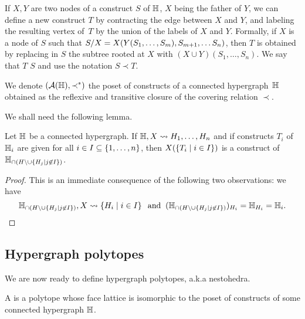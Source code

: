 If $X,Y$ are two nodes of a construct $S$ of ${\mathbb H}$, $X$ being the father of $Y$, we can define a new construct $T$ by contracting the edge between $X$ and $Y$, and labeling the resulting vertex of~$T$ by the union of the labels of $X$ and $Y$. 
Formally, if $X$ is a node of $S$ such that $S/X=X(Y(S_1,\ldots,S_m),S_{m+1},\ldots S_n)$, then  $T$ is obtained by replacing in $S$ the  subtree rooted at $X$ with $(X\cup Y)(S_1,\ldots,S_n)$.  
We say that $T$  $S$ and use the notation $S\prec T$.


\begin{definition} 
  \label{subface-relation}
    We denote $({\cal A}({\mathbb H}),\prec^*)$ the poset of constructs of a connected hypergraph~${\mathbb H}$ obtained as the reflexive and transitive closure of the  covering relation $\prec$.    
\end{definition}
    
We shall need the following lemma.
\begin{lemma} 
  \label{partial-construct}
Let ${\mathbb H}$ be a connected hypergraph. 
If ${\mathbb H},X\leadsto H_1,\ldots,H_n$ and if constructs $T_i$ of~${\mathbb H}_i$ are given for all $i\in I\subseteq \left\{1,\ldots,n\right\}$, then $X(\left\{T_i \mid i\in I\right\})$ is a construct of ${\mathbb H}_{\cap (H\setminus\cup\left\{H_j \mid j\not\in I\right\})}$.
\end{lemma}
\begin{proof} This is an immediate consequence of the following two observations: we have
$${\mathbb H}_{\cap (H\setminus\cup\left\{H_j \mid j\not\in I\right\})},X\leadsto \left\{H_i \mid i\in I\right\}\;\; \mbox{and}\;\; ({\mathbb H}_{\cap (H\setminus\cup\left\{H_j \mid j\not\in I\right\})})_{H_i}={\mathbb H}_{H_i}={\mathbb H}_i.$$
\end{proof}


\subsection{Hypergraph polytopes}
\label{ss:hypergraph-polytopes}

We are now ready to define hypergraph polytopes, a.k.a nestohedra.

\begin{definition}
    A  is a polytope whose face lattice is isomorphic to the poset of constructs of some connected hypergraph ${\mathbb H}$.
\end{definition}

